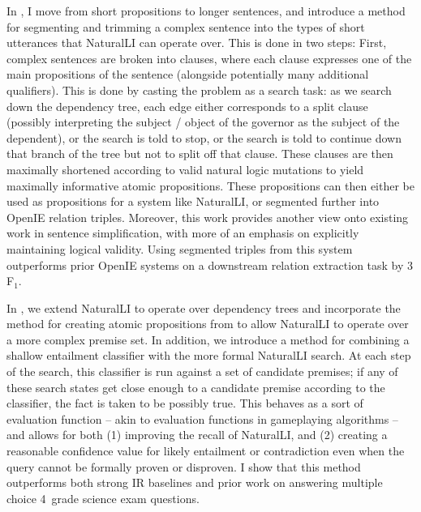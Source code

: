 In , I move from short propositions to longer sentences, and introduce a method for
  segmenting and trimming a complex sentence into the types of short utterances that NaturalLI can
  operate over.
This is done in two steps: First, complex sentences are broken into clauses, where each clause
  expresses one of the main propositions of the sentence (alongside potentially many additional
  qualifiers).
This is done by casting the problem as a search task: as we search down the dependency tree, each
  edge either corresponds to a split clause (possibly interpreting the subject / object of the
  governor as the subject of the dependent), or the search is told to stop, or the search is told
  to continue down that branch of the tree but not to split off that clause.
These clauses are then maximally shortened according to valid natural logic mutations to yield
  maximally informative atomic propositions.
These propositions can then either be used as propositions for a system like NaturalLI, or segmented
  further into OpenIE relation triples.
Moreover, this work provides another view onto existing work in sentence simplification, with more
  of an emphasis on explicitly maintaining logical validity.
Using segmented triples from this system outperforms prior OpenIE systems on a downstream relation
  extraction task by 3 F$_1$.

In , we extend NaturalLI to operate over dependency trees and incorporate the method for
  creating atomic propositions from  to allow NaturalLI to operate over a more complex
  premise set.
In addition, we introduce a method for combining a shallow entailment classifier with the more formal
  NaturalLI search.
At each step of the search, this classifier is run against a set of candidate premises; if any of these
  search states get close enough to a candidate premise according to the classifier, the fact is taken
  to be possibly true.
This behaves as a sort of evaluation function -- akin to evaluation functions in gameplaying algorithms --
  and allows for both (1) improving the recall of NaturalLI, and (2) creating a reasonable confidence
  value for likely entailment or contradiction even when the query cannot be formally proven or disproven.
I show that this method outperforms both strong IR baselines and prior work on answering multiple choice
  4\nth\ grade science exam questions.


